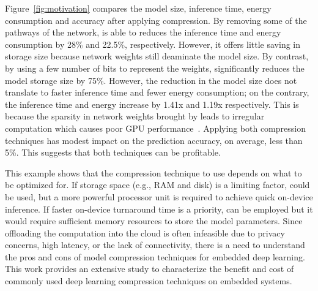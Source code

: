  Figure~\ref{fig:motivation} compares the model size, inference time, energy consumption and accuracy after
applying compression. By removing some of the pathways of the network, \pruning is able to reduces the inference time and energy
consumption by 28\% and 22.5\%, respectively. However, it offers little saving in storage size because network weights still deaminate the
model size. By contrast, by using a few number of bits to represent the weights, \quantization significantly reduces the model storage size
by 75\%. However, the reduction in the model size does not translate to faster inference time and fewer energy consumption; on the
contrary, the inference time and energy increase by 1.41x and 1.19x respectively.
This is because the sparsity in network weights brought by \quantization leads to irregular computation which causes poor GPU
performance~\cite{DBLP:journals/corr/abs-1802-10280}. Applying both compression techniques has modest impact on the prediction accuracy, on
average, less than 5\%. This suggests that both techniques can be profitable.

 This example shows that the compression technique to use depends on what to be optimized for. If storage
space (e.g., RAM and disk) is a limiting factor, \quantization could be used, but a more powerful processor unit is required to achieve
quick on-device inference. If faster on-device turnaround time is a priority, \pruning can be employed but it would require sufficient
memory resources to store the model parameters.  Since offloading the computation into the cloud is often infeasible due to privacy
concerns, high latency, or the lack of connectivity, there is a need to understand the pros and cons of model compression techniques for
embedded deep learning. This work provides an extensive study to characterize the benefit and cost of commonly used deep learning
compression techniques on embedded systems.
